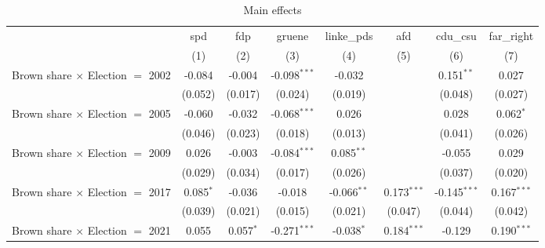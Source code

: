
\begin{table}[htbp]
   \caption{Main effects}
   \centering
   \begin{tabular}{lccccccc}
      \tabularnewline \midrule \midrule
                                                              & spd            & fdp            & gruene                 & linke\_pds     & afd            & cdu\_csu       & far\_right\\   
                                                              & (1)            & (2)            & (3)                    & (4)            & (5)            & (6)            & (7)\\  
      Brown share $\times$ Election $=$ 2002                  & -0.084         & -0.004         & -0.098$^{***}$         & -0.032         &                & 0.151$^{**}$   & 0.027\\   
                                                              & (0.052)        & (0.017)        & (0.024)                & (0.019)        &                & (0.048)        & (0.027)\\   
      Brown share $\times$ Election $=$ 2005                  & -0.060         & -0.032         & -0.068$^{***}$         & 0.026          &                & 0.028          & 0.062$^{*}$\\   
                                                              & (0.046)        & (0.023)        & (0.018)                & (0.013)        &                & (0.041)        & (0.026)\\   
      Brown share $\times$ Election $=$ 2009                  & 0.026          & -0.003         & -0.084$^{***}$         & 0.085$^{**}$   &                & -0.055         & 0.029\\   
                                                              & (0.029)        & (0.034)        & (0.017)                & (0.026)        &                & (0.037)        & (0.020)\\   
      Brown share $\times$ Election $=$ 2017                  & 0.085$^{*}$    & -0.036         & -0.018                 & -0.066$^{**}$  & 0.173$^{***}$  & -0.145$^{***}$ & 0.167$^{***}$\\   
                                                              & (0.039)        & (0.021)        & (0.015)                & (0.021)        & (0.047)        & (0.044)        & (0.042)\\   
      Brown share $\times$ Election $=$ 2021                  & 0.055          & 0.057$^{*}$    & -0.271$^{***}$         & -0.038$^{*}$   & 0.184$^{***}$  & -0.129         & 0.190$^{***}$\\   

\end{tabular}
\end{table}

